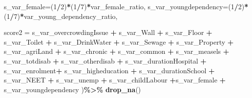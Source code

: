 \documentclass[
]{article}
\newenvironment{Shaded}{\begin{snugshade}}{\end{snugshade}}
\newcommand{\AttributeTok}[1]{\textcolor[rgb]{0.13,0.29,0.53}{#1}}
\newcommand{\DecValTok}[1]{\textcolor[rgb]{0.00,0.00,0.81}{#1}}
\newcommand{\FunctionTok}[1]{\textcolor[rgb]{0.13,0.29,0.53}{\textbf{#1}}}
\newcommand{\NormalTok}[1]{#1}
\newcommand{\SpecialCharTok}[1]{\textcolor[rgb]{0.81,0.36,0.00}{\textbf{#1}}}
\begin{document}
\begin{Shaded}
\begin{Highlighting}[]
    \AttributeTok{s\_var\_female=}\NormalTok{(}\DecValTok{1}\SpecialCharTok{/}\DecValTok{2}\NormalTok{)}\SpecialCharTok{*}\NormalTok{(}\DecValTok{1}\SpecialCharTok{/}\DecValTok{7}\NormalTok{)}\SpecialCharTok{*}\NormalTok{var\_female\_ratio,}
    \AttributeTok{s\_var\_youngdependency=}\NormalTok{(}\DecValTok{1}\SpecialCharTok{/}\DecValTok{2}\NormalTok{)}\SpecialCharTok{*}\NormalTok{(}\DecValTok{1}\SpecialCharTok{/}\DecValTok{7}\NormalTok{)}\SpecialCharTok{*}\NormalTok{var\_young\_dependency\_ratio,}
    
    \AttributeTok{score2 =}\NormalTok{ s\_var\_overcrowdingIssue  }\SpecialCharTok{+}\NormalTok{ s\_var\_Wall }\SpecialCharTok{+}\NormalTok{ s\_var\_Floor }\SpecialCharTok{+}\NormalTok{  s\_var\_Toilet }\SpecialCharTok{+}\NormalTok{ s\_var\_DrinkWater }\SpecialCharTok{+}\NormalTok{ s\_var\_Sewage }\SpecialCharTok{+}\NormalTok{ s\_var\_Property }\SpecialCharTok{+}\NormalTok{ s\_var\_agriLand }\SpecialCharTok{+}\NormalTok{ s\_var\_chronic }\SpecialCharTok{+}\NormalTok{ s\_var\_common }\SpecialCharTok{+}\NormalTok{ s\_var\_measels }\SpecialCharTok{+}\NormalTok{ s\_var\_totdisab }\SpecialCharTok{+}\NormalTok{ s\_var\_otherdisab }\SpecialCharTok{+}
\NormalTok{      s\_var\_durationHospital }\SpecialCharTok{+}\NormalTok{ s\_var\_enrolment}\SpecialCharTok{+}\NormalTok{ s\_var\_higheducation }\SpecialCharTok{+}\NormalTok{ s\_var\_durationSchool }\SpecialCharTok{+}\NormalTok{ s\_var\_NEET }\SpecialCharTok{+}\NormalTok{  s\_var\_unemp }\SpecialCharTok{+}\NormalTok{ s\_var\_childLabour }\SpecialCharTok{+}\NormalTok{s\_var\_female }\SpecialCharTok{+}\NormalTok{  s\_var\_youngdependency )}\SpecialCharTok{\%\textgreater{}\%}
  \FunctionTok{drop\_na}\NormalTok{()}
\end{Highlighting}
\end{Shaded}
\end{document}
